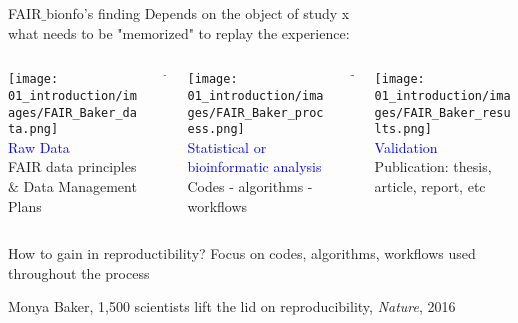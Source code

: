 \begin{frame}{FAIR$\_$bionfo's finding}
Depends on the object of study x \\
\quad \quad \quad what needs to be "memorized" to replay the experience:
\begin{columns}[t]
  \begin{column}{.3\textwidth}\begin{center}
        \texttt{[image: 01\_introduction/images/FAIR\_Baker\_data.png]}\\
        \textcolor{blue}{Raw Data}\\FAIR data principles $\&$ Data Management Plans
      \end{center}\end{column}
      \begin{column}{.05\textwidth}\begin{center}
         $\rightarrow$
      \end{center}\end{column}
      \begin{column}{.3\textwidth}\begin{center}
         \texttt{[image: 01\_introduction/images/FAIR\_Baker\_process.png]}\\
         \textcolor{blue}{Statistical or bioinformatic analysis}\\Codes - algorithms - workflows
      \end{center}\end{column}
      \begin{column}{.05\textwidth}\begin{center}
         $\rightarrow$
      \end{center}\end{column}
      \begin{column}{0.3\textwidth}\begin{center}
         \texttt{[image: 01\_introduction/images/FAIR\_Baker\_results.png]}\\
         \textcolor{blue}{Validation}\\Publication: thesis, article, report, etc
        \end{center}\end{column}
  \end{columns}
  \begin{block}{How to gain in reproductibility?}
   Focus on codes, algorithms, workflows used throughout the process
  \end{block}
  \vfill
  \tiny{Monya Baker, 1,500 scientists lift the lid on reproducibility, \textit{Nature}, 2016}
\end{frame}
